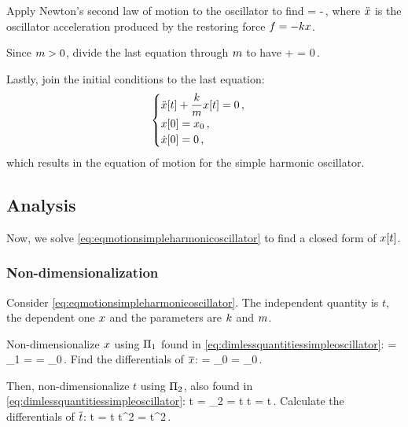 Apply Newton's second law of motion to the oscillator to find
\beq
\mass\oacc = -\kspring\odisp\,,
\eeq
where $\ddot{x}$ is the oscillator acceleration produced by the restoring force $f = -kx$.

Since $m > 0$, divide the last equation through $m$ to have
\beq
\oacc + \dfrac{\kspring}{\mass}\odisp = 0\,.
\eeq

Lastly, join the initial conditions to the last equation:
\begin{equation}\label{eq:eqmotionsimpleharmonicoscillator}
  \begin{cases}
      \ddot{x}\!\left[{t}\right] + \dfrac{k}{m}x\!\left[{t}\right] = 0\,, \\
      x\!\left[{0}\right] = x_0\,, \\
      \dot{x}\!\left[{0}\right] = 0\,,
  \end{cases}
\end{equation}
which results in the equation of motion for the simple harmonic oscillator.


\subsection{Analysis}
Now, we solve \cref{eq:eqmotionsimpleharmonicoscillator} to find a closed form of $x\!\left[{t}\right]$.


\subsubsection{Non-dimensionalization}
Consider \cref{eq:eqmotionsimpleharmonicoscillator}. The independent quantity is $t$, the dependent one $x$ and the parameters are $k$ and $m$.

Non-dimensionalize $x$ using $\Pi_1$ found in \cref{eq:dimlessquantitiessimpleoscillator}:
\beq
\scpq\odisp = \kdim_1 = \implies
\odisp = \odisp_0\scpq\odisp\,. 
\eeq
Find the differentials of $\overline{x}$:
\beq
   \dx\odisp = \odisp_0\dx\scpq\odisp\qquad{}\qquad
{}\odisp = \odisp_0\scpq\odisp\,.
\eeq

Then, non-dimensionalize $t$ using $\Pi_2$, also found in \cref{eq:dimlessquantitiessimpleoscillator}:
\beq
\scpq t = \kdim_2 = t\sqrt{\dfrac{\kspring}{\mass}}\implies
t = \scpq t\sqrt{\dfrac{\mass}{\kspring}}\,.
\eeq
Calculate the differentials of $\overline{t}$:
\beq
\dx t = \dx\scpq t\sqrt{\dfrac{\mass}{\kspring}}\qquad{}\qquad
\dx t^2 = \dx\scpq t^2\dfrac{\mass}{\kspring}\,.
\eeq

